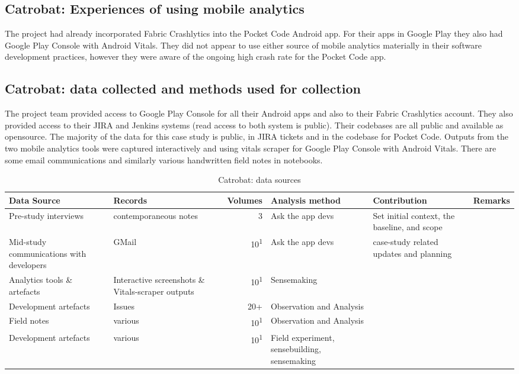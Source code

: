 \subsection{Catrobat: Experiences of using mobile analytics}
The project had already incorporated Fabric Crashlytics into the Pocket Code Android app. %
For their apps in Google Play they also had Google Play Console with Android Vitals. They did not appear to use either source of mobile analytics materially in their software development practices, however they were aware of the ongoing high crash rate for the Pocket Code app. %

\subsection{Catrobat: data collected and methods used for collection}
The project team provided access to Google Play Console for all their Android apps and also to their Fabric Crashlytics account. They also provided access to their JIRA and Jenkins systems (read access to both system is public). Their codebases are all public and available as opensource. The majority of the data for this case study is public, in JIRA tickets and in the codebase for Pocket Code. Outputs from the two mobile analytics tools were captured interactively and using vitals scraper for Google Play Console with Android Vitals. There are some email communications and similarly various handwritten field notes in notebooks.


\begin{table}
    \centering
    \footnotesize
    \tabcolsep=0.12cm
    \begin{tabular}{p{2.4cm}p{2.4cm}r>{\raggedright}p{2.4cm}>{\raggedright}p{3cm}>{\raggedright\arraybackslash}p{2.5cm}}
        Data Source & Records & Volumes & Analysis method & Contribution & Remarks \\
        \toprule
         Pre-study interviews & contemporaneous notes\footnotemark & 3 & Ask the app devs & Set initial context, the baseline, and scope &  \\
         Mid-study communications with developers & GMail & 10\textsuperscript{1} & Ask the app devs & case-study related updates and planning &  \\
         Analytics tools \& artefacts & Interactive screenshots \& Vitals-scraper outputs &10\textsuperscript{1} & Sensemaking &  &  \\
         Development artefacts & Issues & 20+ & Observation and Analysis & & \\
         Field notes & various & 10\textsuperscript{1} & Observation and Analysis & & \\
         Development artefacts & various\footnotemark & 10\textsuperscript{1} & Field experiment, sensebuilding, sensemaking & & \\
         \bottomrule
    \end{tabular}
    \caption{Catrobat: data sources}
    \label{tab:catrobat-data-sources}
\end{table}

